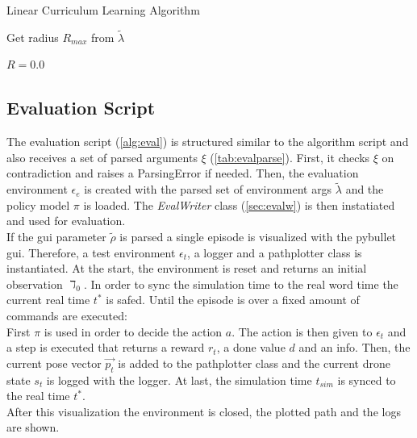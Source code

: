 \newpage

\begin{algorithm}
	\caption{Linear Curriculum Learning Algorithm}
	\label{alg:curri}
	
	Get radius $R_{max}$ from $\tilde{\lambda}$
	
	$R = 0.0$
	
\end{algorithm}

\subsection{Evaluation Script}
The evaluation script (\cref{alg:eval}) is structured similar to the algorithm script and also receives a set of
parsed arguments $\xi$ (\cref{tab:evalparse}). First, it checks $\xi$ on contradiction and raises a ParsingError if needed. Then, the evaluation environment $\epsilon_e$ is created with the parsed set of environment args $\tilde{\lambda}$ and the policy model $\pi$ is loaded. The \emph{EvalWriter} class (\cref{sec:evalw}) is then instatiated and used for evaluation.\\
If the gui parameter $\tilde{\rho}$ is parsed a single episode is visualized with the pybullet gui. 
Therefore, a test environment $\epsilon_t$, a logger and a pathplotter class is instantiated.
At the start, the environment is reset and returns an initial observation $\daleth_0$. In order to sync the simulation time to the real word time the current real time $t^*$ is safed.
Until the episode is over a fixed amount of commands are executed:\\
\newline
First $\pi$ is used in order to decide the action $a$. The action is then given to $\epsilon_t$ and a step is executed that returns a reward $r_t$, a done value $d$ and an info.
Then, the current pose vector $\overrightarrow{p_t}$ is added to the pathplotter class and the current drone state $s_t$ is logged with the logger. At last, the simulation time $t_{sim}$ is synced to the real time $t^*$.\\
\newline
After this visualization the environment is closed, the plotted path and the logs are shown.

